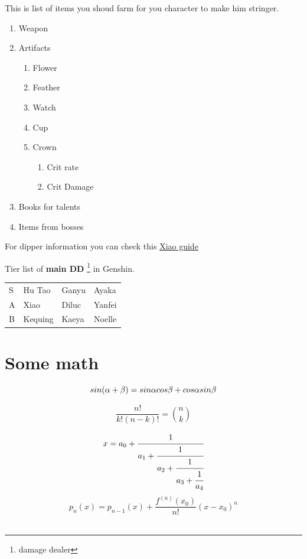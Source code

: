 \documentclass[10pt,a4paper]{report}
\begin{document}
\noindent This is list of items you shoud farm for you character to make him stringer.

\begin{enumerate}
	\item Weapon
	\item Artifacts
	\begin{enumerate}
		\item Flower
		\item Feather
		\item Watch
		\item Cup
		\item Crown
		\begin{enumerate}
		    \item Crit rate
		    \item Crit Damage
		\end{enumerate}
	\end{enumerate}
	\item Books for talents
	\item Items from bosses
\end{enumerate}

For dipper information you can check this \href{https://www.youtube.com/watch?v=U_ow8r_vuzs}{Xiao guide}
\newpage

\begin{center} 
Tier list of \textbf{main DD} \footnote{damage dealer} in Genshin.
\end{center}
\begin{tabular}{llll}
	\cellcolor{Red} S & Hu Tao 	& Ganyu & Ayaka\\
	\cellcolor{Gray} A 	& Xiao 	& Diluc & Yanfei\\
	\cellcolor{Green} B	& Kequing 	& Kaeya & Noelle \\
\end{tabular}
\section{Some math}

\begin{equation}
        \small{sin(\alpha + \beta) = sin\alpha cos\beta + cos\alpha sin\beta}
    \end{equation}

\begin{equation}
        \frac{n!}{k!(n-k)!} = \binom{n}{k}
    \end{equation}
    
\begin{equation}
  x = a_0 + \cfrac{1}{a_1 
          + \cfrac{1}{a_2 
          + \cfrac{1}{a_3 + \cfrac{1}{a_4} } } }
\end{equation}
\begin{equation}
    p_n(x) = p_{n-1}(x) + \frac{f^{(n)}(x_0)}{n!}(x-x_0)^n
\end{equation}\\
\end{document}
